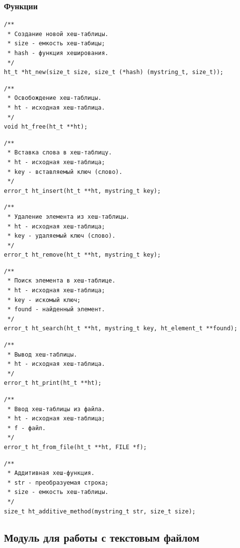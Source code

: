 \documentclass[a4paper,12pt]{extarticle}
\begin{document}
\subsubsection{Функции}

\begin{verbatim}
/**
 * Создание новой хеш-таблицы.
 * size - емкость хеш-табицы;
 * hash - функция хеширования.
 */
ht_t *ht_new(size_t size, size_t (*hash) (mystring_t, size_t));
\end{verbatim}

\begin{verbatim}
/**
 * Освобождение хеш-таблицы.
 * ht - исходная хеш-таблица.
 */
void ht_free(ht_t **ht);
\end{verbatim}

\begin{verbatim}
/**
 * Вставка слова в хеш-таблицу.
 * ht - исходная хеш-таблица;
 * key - вставляемый ключ (слово).
 */
error_t ht_insert(ht_t **ht, mystring_t key);
\end{verbatim}

\begin{verbatim}
/**
 * Удаление элемента из хеш-таблицы.
 * ht - исходная хеш-таблица;
 * key - удаляемый ключ (слово).
 */
error_t ht_remove(ht_t **ht, mystring_t key);
\end{verbatim}

\begin{verbatim}
/**
 * Поиск элемента в хеш-таблице.
 * ht - исходная хеш-таблица;
 * key - искомый ключ;
 * found - найденный элемент.
 */
error_t ht_search(ht_t **ht, mystring_t key, ht_element_t **found);
\end{verbatim}

\begin{verbatim}
/**
 * Вывод хеш-таблицы.
 * ht - исходная хеш-таблица.
 */
error_t ht_print(ht_t **ht);
\end{verbatim}

\begin{verbatim}
/**
 * Ввод хеш-таблицы из файла.
 * ht - исходная хеш-таблица;
 * f - файл.
 */
error_t ht_from_file(ht_t **ht, FILE *f);
\end{verbatim}

\begin{verbatim}
/**
 * Аддитивная хеш-функция.
 * str - преобразуемая строка;
 * size - емкость хеш-таблицы.
 */
size_t ht_additive_method(mystring_t str, size_t size);
\end{verbatim}


\subsection{Модуль для работы с текстовым файлом}
\end{document}

